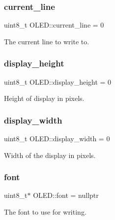 \subsubsection{\texorpdfstring{current\+\_\+line}{current\_line}}
{\footnotesize\ttfamily uint8\+\_\+t O\+L\+E\+D\+::current\+\_\+line = 0\hspace{0.3cm}{\ttfamily [protected]}}

The current line to write to. \hypertarget{class_o_l_e_d_add08b51dec0ffeebcba7902c3bd4aeea}{}\label{class_o_l_e_d_add08b51dec0ffeebcba7902c3bd4aeea} 
\subsubsection{\texorpdfstring{display\+\_\+height}{display\_height}}
{\footnotesize\ttfamily uint8\+\_\+t O\+L\+E\+D\+::display\+\_\+height = 0\hspace{0.3cm}{\ttfamily [protected]}}

Height of display in pixels. \hypertarget{class_o_l_e_d_a2e9305cb3341509bb62d61f33cae76fd}{}\label{class_o_l_e_d_a2e9305cb3341509bb62d61f33cae76fd} 
\subsubsection{\texorpdfstring{display\+\_\+width}{display\_width}}
{\footnotesize\ttfamily uint8\+\_\+t O\+L\+E\+D\+::display\+\_\+width = 0\hspace{0.3cm}{\ttfamily [protected]}}

Width of the display in pixels. \hypertarget{class_o_l_e_d_a29ab86a4a73f4d343bf1810927f0911d}{}\label{class_o_l_e_d_a29ab86a4a73f4d343bf1810927f0911d} 
\subsubsection{\texorpdfstring{font}{font}}
{\footnotesize\ttfamily uint8\+\_\+t$\ast$ O\+L\+E\+D\+::font = nullptr\hspace{0.3cm}{\ttfamily [protected]}}

The font to use for writing. \hypertarget{class_o_l_e_d_a85b91421932866dea031921799ba83a3}{}\label{class_o_l_e_d_a85b91421932866dea031921799ba83a3} 
